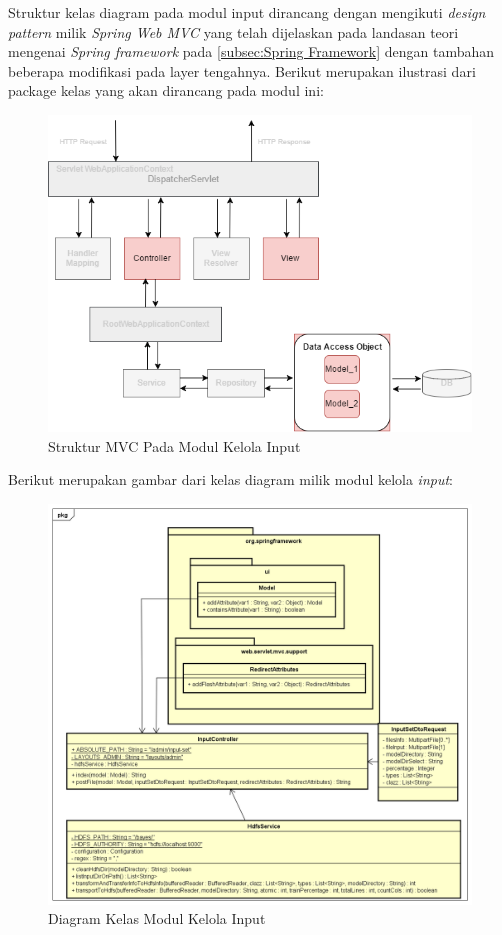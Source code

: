Struktur kelas diagram pada modul input dirancang dengan mengikuti \textit{design pattern} milik \textit{Spring Web MVC} yang telah dijelaskan pada landasan teori mengenai \textit{Spring framework} pada \ref{subsec:Spring Framework} dengan tambahan beberapa modifikasi pada layer tengahnya. Berikut merupakan ilustrasi dari package kelas yang akan dirancang pada modul ini:
\begin{figure}[H]
	\centering
	\includegraphics[scale=0.7]{ClassDiagramLengkap/springmvc_rev1}
	\caption[Struktur MVC Pada Modul Kelola Input]{Struktur MVC Pada Modul Kelola Input}
	\label{fig:Struktur MVC Pada Modul Kelola Input}
\end{figure}

Berikut merupakan gambar dari kelas diagram milik modul kelola \textit{input}:
\begin{figure}[H]
	\centering
	\includegraphics[scale=0.54]{ClassDiagramLengkap/CD_Input}
	\caption[Diagram Kelas Modul Kelola Input]{Diagram Kelas Modul Kelola Input}
	\label{fig:Diagram Kelas Modul Kelola Input}
\end{figure}

